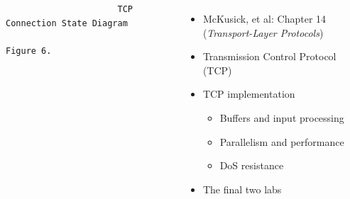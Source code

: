 \begin{frame}[fragile]
\begin{columns}[T]
\begin{Tiny}
\begin{verbatim}
                      TCP Connection State Diagram
                               Figure 6.
\end{verbatim}
  \end{Tiny}


    \pause

    \begin{itemize}
      \item McKusick, et al: Chapter 14 (\textit{Transport-Layer Protocols})

      \medskip
      \pause

      \item Transmission Control Protocol (TCP)
      \item TCP implementation
      \begin{itemize}
	\item Buffers and input processing
	\item Parallelism and performance
	\item DoS resistance
      \end{itemize}

      \medskip
      \pause

      \item The final two labs
    \end{itemize}
  \end{columns}

\end{frame}


